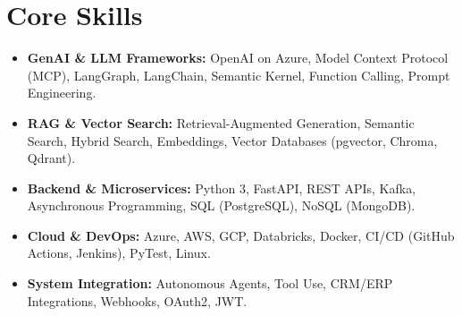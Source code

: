 \documentclass[a4paper,10pt]{article}
\begin{document}
\section{Core Skills}
\begin{itemize}
  \item \textbf{GenAI \& LLM Frameworks:} OpenAI on Azure, Model Context Protocol (MCP), LangGraph, LangChain, Semantic Kernel, Function Calling, Prompt Engineering.
  \item \textbf{RAG \& Vector Search:} Retrieval-Augmented Generation, Semantic Search, Hybrid Search, Embeddings, Vector Databases (pgvector, Chroma, Qdrant).
  \item \textbf{Backend \& Microservices:} Python 3, FastAPI, REST APIs, Kafka, Asynchronous Programming, SQL (PostgreSQL), NoSQL (MongoDB).
  \item \textbf{Cloud \& DevOps:} Azure, AWS, GCP, Databricks, Docker, CI/CD (GitHub Actions, Jenkins), PyTest, Linux.
  \item \textbf{System Integration:} Autonomous Agents, Tool Use, CRM/ERP Integrations, Webhooks, OAuth2, JWT.
\end{itemize}
\end{document}
